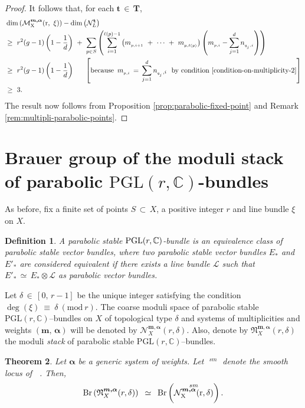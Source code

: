 \documentclass[10pt,reqno]{amsart}
\DeclareMathOperator{\Br}{\textnormal{Br}}
\DeclareMathOperator{\Malpha}{\mc{M}^{\boldsymbol{m,\alpha}}_X(r,\ \xi)}
\DeclareMathOperator{\Nalpha}{\mc{N}^{\boldsymbol{m,\alpha}}_X(r,\delta)}
\newcommand{\mf}[1]{\mathfrak{#1}}
\newcommand{\mc}[1]{\mathcal{#1}}
\newcommand{\bb}[1]{\mathbb{#1}}
\newtheorem{theorem}{Theorem}[section]
\theoremstyle{myroman}
\newtheorem{definition}[theorem]{Definition}
\numberwithin{equation}{section}
\begin{document}
\begin{proof}
			It follows that, for each $\textbf{t}\,\in\, \boldsymbol{T}$,
			\begin{align*}
				&\dim\left(\Malpha\right)- \dim\left(\mc{N}^\textbf{t}_L\right)\nonumber\\
				&\geq\ r^2(g-1)\left(1-\frac{1}{d}\right)\ +\ 
				\sum_{p\in S}\left( \sum_{i=1}^{\ell(p)-1}\left(m_{_{p,i+1}}\ +\ \cdots\ +\
				m_{_{p,\ell(p)}}\right) \left(m_{_{p,i}}-\sum_{j=1}^{d}n_{_{q_{_j},i}}\right)\right)\nonumber\\
				&\geq\ r^2(g-1)\left(1-\frac{1}{d}\right)\ \ \ \ \ \left[\text{because}\ \,m_{_{p,i}}\,=
				\, \sum_{j=1}^{d}n_{_{q_{_j}},i}\ \ \text{by condition}\ \eqref{condition-on-multiplicity-2}\right]\nonumber\\
				&\geq\ 3 .
			\end{align*}
			The result now follows from Proposition \ref{prop:parabolic-fixed-point} and Remark \ref{rem:multipli-parabolic-points}.
		\end{proof}
		
		\section{Brauer group of the moduli stack of parabolic
			$\text{PGL}(r,\bb{C})$-bundles}\label{section:brauer-group-moduli-stack}
		
		As before, fix a finite set of points $S\,\subset\, X$, a positive integer $r$ and line bundle $\xi$ on $X$.
		
		\begin{definition}
			A parabolic stable $\textnormal{PGL}(r,\bb{C})$-bundle is an equivalence class of parabolic stable vector bundles, where two parabolic stable vector bundles $E_*$ and $E'_*$ 
			are considered equivalent if there exists a line bundle $\mc{L}$ such that $E'_*\,\simeq\, E_*\otimes \mc{L}$ as parabolic vector bundles.
		\end{definition}
		
		Let $\delta\,\in\,[0,\,r-1]$ be the unique integer satisfying the condition
		$\deg(\xi)\ \equiv\ \delta\ (\text{mod}\ r)$. The coarse moduli space of parabolic stable
		$\text{PGL}(r,\bb{C})$--bundles on $X$ of topological type $\delta$ and systems of multiplicities and
		weights $(\boldsymbol{m,\,\alpha})$ will be denoted by $\mc{N}^{\boldsymbol{m,\alpha}}_X(r,\delta)$.
		Also, denote by $\mf{N}^{\boldsymbol{m,\alpha}}_X(r,\delta)$ the moduli \textit{stack} of parabolic stable
		$\text{PGL}(r,\bb{C})$--bundles.
		
		\begin{theorem}\label{thm:brauer-group-of-moduli-stack}
			Let $\boldsymbol{\alpha}$ be a generic system of weights. Let $\Nalpha^{sm}$ denote the smooth locus of $\Nalpha$. Then,
			$$\Br\left(\mf{N}^{\boldsymbol{m,\alpha}}_X(r,\delta)\right)\,\ \simeq\,\
			\Br\left(\Nalpha^{sm}\right).$$
		\end{theorem}
		
\end{document}
